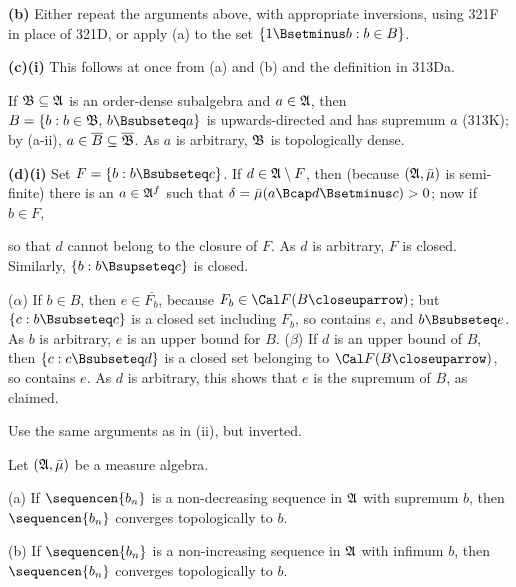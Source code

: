{\medskip

{\bf (b)} Either repeat the arguments above, with appropriate
inversions, using 321F in place of 321D, or apply (a) to the set
$\{1\Bsetminus b:b\in B\}$.

\medskip

{\bf (c)(i)} This follows at once from (a) and (b) and the definition in
313Da.

\medskip

 If $\frak B\subseteq\frak A$ is an order-dense
subalgebra
and $a\in\frak A$, then $B=\{b:b\in\frak B,\,b\Bsubseteq a\}$ is
upwards-directed and has supremum $a$ (313K);  by (a-ii),
$a\in\overline{B}\subseteq\overline{\frak B}$.   As $a$ is arbitrary,
$\frak B$ is topologically dense.

\medskip

{\bf (d)(i)} Set $F=\{b:b\Bsubseteq c\}$.   If $d\in\frak A\setminus F$,
then (because $(\frak A,\bar\mu)$ is semi-finite) there is an $a\in\frak
A^f$ such that $\delta=\bar\mu(a\Bcap d\Bsetminus c)>0$;  now if $b\in
F$,


\noindent so that $d$ cannot belong to the closure of $F$.   As $d$ is
arbitrary, $F$ is closed.   Similarly, $\{b:b\Bsupseteq c\}$ is closed.

\medskip

 ($\alpha$) If $b\in B$, then $e\in\overline{F_b}$,
because $F_b\in\Cal F(B\closeuparrow)$;  but
$\{c:b\Bsubseteq c\}$ is a closed set including $F_b$, so
contains $e$, and $b\Bsubseteq e$.   As $b$ is arbitrary, $e$ is an
upper bound for $B$.   ($\beta$)
If $d$ is an upper bound of $B$, then $\{c:c\Bsubseteq d\}$
is a closed set belonging to $\Cal F(B\closeuparrow)$, so
contains $e$.   As $d$ is arbitrary, this shows that $e$ is the
supremum of $B$, as claimed.

\medskip

 Use the same arguments as in (ii), but inverted.
}%

 Let $(\frak A,\bar\mu)$ be a measure algebra.

(a) If $\sequencen{b_n}$ is a non-decreasing sequence in $\frak A$ with
supremum $b$, then $\sequencen{b_n}$ converges topologically to $b$.

(b) If $\sequencen{b_n}$ is a non-increasing sequence in $\frak A$ with
infimum $b$, then $\sequencen{b_n}$ converges topologically to $b$.

